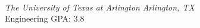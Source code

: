 \\
\textit{The University of Texas at Arlington} \hfill \textit{Arlington, TX}\\
Engineering GPA: 3.8